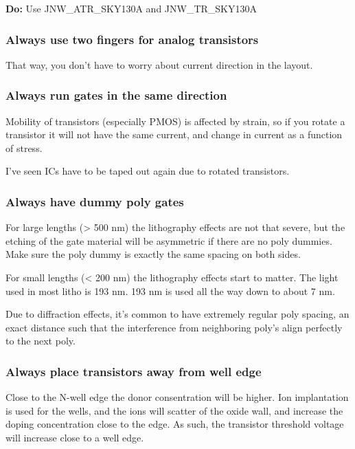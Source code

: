 \textbf{Do:} Use JNW\_ATR\_SKY130A and JNW\_TR\_SKY130A

\subsubsection{Always use two fingers for analog
transistors}\label{always-use-two-fingers-for-analog-transistors}

That way, you don't have to worry about current direction in the layout.

\subsubsection{Always run gates in the same
direction}\label{always-run-gates-in-the-same-direction}

Mobility of transistors (especially PMOS) is affected by strain, so if
you rotate a transistor it will not have the same current, and change in
current as a function of stress.

I've seen ICs have to be taped out again due to rotated transistors.

\subsubsection{Always have dummy poly
gates}\label{always-have-dummy-poly-gates}

For large lengths (\textgreater{} 500 nm) the lithography effects are
not that severe, but the etching of the gate material will be asymmetric
if there are no poly dummies. Make sure the poly dummy is exactly the
same spacing on both sides.

For small lengths (\textless{} 200 nm) the lithography effects start to
matter. The light used in most litho is 193 nm. 193 nm is used all the
way down to about 7 nm.

Due to diffraction effects, it's common to have extremely regular poly
spacing, an exact distance such that the interference from neighboring
poly's align perfectly to the next poly.

\subsubsection{Always place transistors away from well
edge}\label{always-place-transistors-away-from-well-edge}

Close to the N-well edge the donor consentration will be higher. Ion
implantation is used for the wells, and the ions will scatter of the
oxide wall, and increase the doping concentration close to the edge. As
such, the transistor threshold voltage will increase close to a well
edge.

